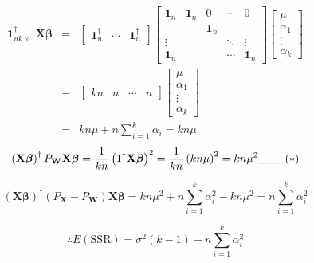 \documentclass{article}
\begin{document}
\begin{eqnarray*}
\mathbf{1}_{nk\times 1}^{\dagger }\mathbf{X\beta } &\mathbf{=}&\left[ 
\begin{array}{ccc}
\mathbf{1}_{n}^{\dagger } & \mathbf{\cdots } & \mathbf{1}_{n}^{\dagger }%
\end{array}%
\right] \left[ 
\begin{array}{ccccc}
\mathbf{1}_{n} & \mathbf{1}_{n} & 0 & \cdots & 0 \\ 
&  & \mathbf{1}_{n} &  &  \\ 
\vdots &  &  & \ddots & \vdots \\ 
\mathbf{1}_{n} &  &  & \cdots & \mathbf{1}_{n}%
\end{array}%
\right] \left[ 
\begin{array}{c}
\mu \\ 
\alpha _{1} \\ 
\vdots \\ 
\alpha _{k}%
\end{array}%
\right] \\
&=&\left[ 
\begin{array}{cccc}
kn & n & \cdots & n%
\end{array}%
\right] \left[ 
\begin{array}{c}
\mu \\ 
\alpha _{1} \\ 
\vdots \\ 
\alpha _{k}%
\end{array}%
\right] \\
&=&kn\mu +n\sum\limits_{i=1}^{k}\alpha _{i}=kn\mu
\end{eqnarray*}%
\begin{equation*}
\therefore \left( \mathbf{X\beta }\right) ^{\dagger }P_{\mathbf{W}}\mathbf{%
X\beta }=\frac{1}{kn}\left( 1^{\dagger }\mathbf{X\beta }\right) ^{2}=\frac{1%
}{kn}\left( kn\mu \right) ^{2}=kn\mu ^{2}\mathbf{\_\_\_}\left( \ast \right)
\end{equation*}

\bigskip

\begin{equation*}
\left( \mathbf{X\beta }\right) ^{\dagger }\left( P_{\mathbf{X}}-P_{\mathbf{W}%
}\right) \mathbf{X\beta }=kn\mu ^{2}+n\sum_{i=1}^{k}\alpha _{i}^{2}-kn\mu
^{2}=n\sum_{i=1}^{k}\alpha _{i}^{2}
\end{equation*}

\begin{equation*}
\therefore E\left( \text{SSR}\right) =\sigma ^{2}\left( k-1\right)
+n\sum\limits_{i=1}^{k}\alpha _{i}^{2}
\end{equation*}
\end{document}
